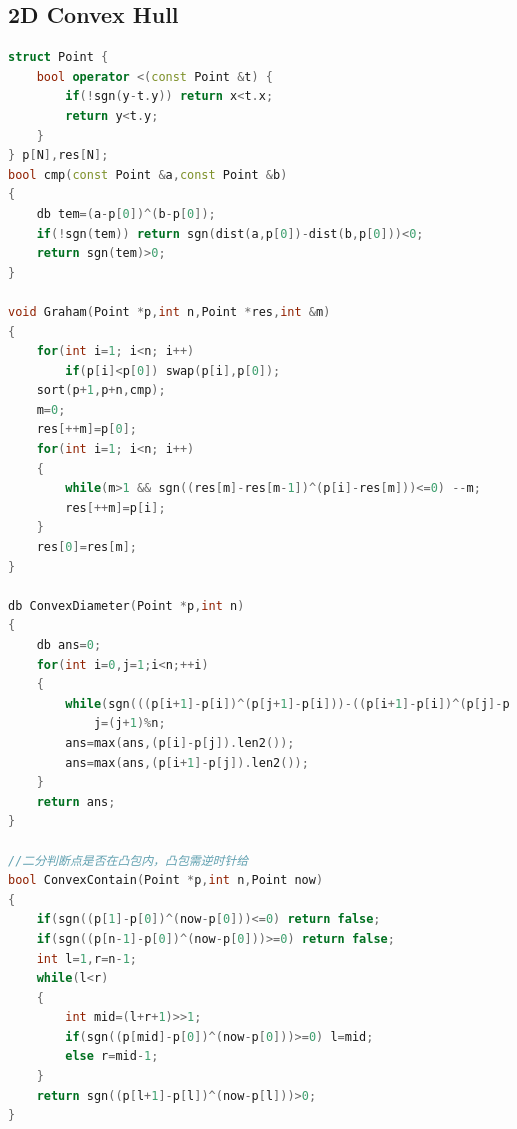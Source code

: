 \documentclass[UTF8,a4paper,titlepage]{ctexart}
\begin{document}
\subsection{2D Convex Hull}
\begin{lstlisting}[language=C++]
struct Point {
    bool operator <(const Point &t) {
        if(!sgn(y-t.y)) return x<t.x;
        return y<t.y;
    }
} p[N],res[N];
bool cmp(const Point &a,const Point &b)
{
    db tem=(a-p[0])^(b-p[0]);
    if(!sgn(tem)) return sgn(dist(a,p[0])-dist(b,p[0]))<0;
    return sgn(tem)>0;
}

void Graham(Point *p,int n,Point *res,int &m)
{
    for(int i=1; i<n; i++)
        if(p[i]<p[0]) swap(p[i],p[0]);
    sort(p+1,p+n,cmp);
    m=0;
    res[++m]=p[0];
    for(int i=1; i<n; i++)
    {
        while(m>1 && sgn((res[m]-res[m-1])^(p[i]-res[m]))<=0) --m;
        res[++m]=p[i];
    }
    res[0]=res[m];
}

db ConvexDiameter(Point *p,int n)
{
    db ans=0;
    for(int i=0,j=1;i<n;++i)
    {
        while(sgn(((p[i+1]-p[i])^(p[j+1]-p[i]))-((p[i+1]-p[i])^(p[j]-p[i])))>=0)//=?
            j=(j+1)%n;
        ans=max(ans,(p[i]-p[j]).len2());
        ans=max(ans,(p[i+1]-p[j]).len2());
    }
    return ans;
}

//二分判断点是否在凸包内，凸包需逆时针给
bool ConvexContain(Point *p,int n,Point now)
{
    if(sgn((p[1]-p[0])^(now-p[0]))<=0) return false;
    if(sgn((p[n-1]-p[0])^(now-p[0]))>=0) return false;
    int l=1,r=n-1;
    while(l<r)
    {
        int mid=(l+r+1)>>1;
        if(sgn((p[mid]-p[0])^(now-p[0]))>=0) l=mid;
        else r=mid-1;
    }
    return sgn((p[l+1]-p[l])^(now-p[l]))>0;
}


\end{lstlisting}
\end{document}
